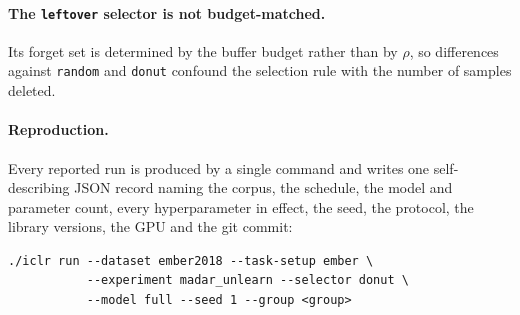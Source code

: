 \paragraph{The \texttt{leftover} selector is not budget-matched.}
Its forget set is determined by the buffer budget rather than by $\rho$, so
differences against \texttt{random} and \texttt{donut} confound the selection
rule with the number of samples deleted.

\paragraph{Reproduction.}
Every reported run is produced by a single command and writes one self-describing
JSON record naming the corpus, the schedule, the model and parameter count, every
hyperparameter in effect, the seed, the protocol, the library versions, the GPU
and the git commit:
\begin{verbatim}
./iclr run --dataset ember2018 --task-setup ember \
           --experiment madar_unlearn --selector donut \
           --model full --seed 1 --group <group>
\end{verbatim}
